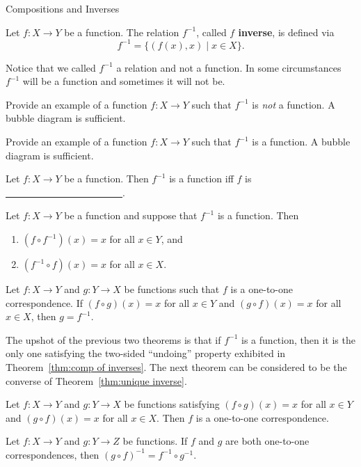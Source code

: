 \begin{section}{Compositions and Inverses}
\begin{definition}
Let $f:X\to Y$ be a function.  The relation $f^{-1}$, called \textbf{$f$ inverse}, is defined via
\[
f^{-1}=\{(f(x),x)\mid x\in X\}.
\]
\end{definition}

Notice that we called $f^{-1}$ a relation and not a function.  In some circumstances $f^{-1}$ will be a function and sometimes it will not be.

\begin{exercise}
Provide an example of a function $f:X\to Y$ such that $f^{-1}$ is \emph{not} a function.  A bubble diagram is sufficient.
\end{exercise}

\begin{exercise}
Provide an example of a function $f:X\to Y$ such that $f^{-1}$ is a function. A bubble diagram is sufficient.
\end{exercise}

\begin{theorem}
Let $f:X\to Y$ be a function.  Then $f^{-1}$ is a function iff $f$ is \underline{\ \ \ \ \ \ \ \ \ \ \ \ \ \ \ \ \ \ \ \ \ \ \ \ }.
\end{theorem}

\begin{theorem}\label{thm:comp of inverses}
Let $f:X\to Y$ be a function and suppose that $f^{-1}$ is a function.  Then
\begin{enumerate}[label=\textrm{(\alph*)}]
\item $(f\circ f^{-1})(x)=x$ for all $x\in Y$, and
\item $(f^{-1}\circ f)(x)=x$ for all $x\in X$.
\end{enumerate}
\end{theorem}

\begin{theorem}\label{thm:unique inverse}
Let $f:X\to Y$ and $g:Y\to X$ be functions such that $f$ is a one-to-one correspondence.  If $(f\circ g)(x)=x$ for all $x\in Y$ and $(g\circ f)(x)=x$ for all $x\in X$, then $g=f^{-1}$.
\end{theorem}

The upshot of the previous two theorems is that if $f^{-1}$ is a function, then it is the only one satisfying the two-sided ``undoing'' property exhibited in Theorem~\ref{thm:comp of inverses}. The next theorem can be considered to be the converse of Theorem~\ref{thm:unique inverse}.

\begin{theorem}
Let $f:X\to Y$ and $g:Y\to X$ be functions satisfying $(f\circ g)(x)=x$ for all $x\in Y$ and $(g\circ f)(x)=x$ for all $x\in X$.  Then $f$ is a one-to-one correspondence.
\end{theorem}

\begin{theorem}
Let $f:X\to Y$ and $g:Y\to Z$ be functions.  If $f$ and $g$ are both one-to-one correspondences, then $(g\circ f)^{-1}=f^{-1}\circ g^{-1}$.
\end{theorem}

\end{section}